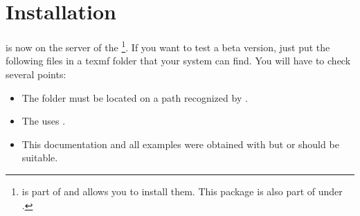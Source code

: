 \section{Installation}

\tkzname{\tkznameofpack} is now on the server of the \footnote{\tkzname{\tkznameofpack} is part of  and  allows you to install them. This package is also part of  under .}. If you want to test a beta version, just put the following files in a texmf folder that your system can find.
You will have to check several points:

\begin{itemize}\setlength{\itemsep}{5pt}
\item  The \tkzname{\tkznameofpack} folder must be located on a path recognized by .
\item  The  \tkzname{\tkznameofpack} uses .
\item This documentation and all examples were obtained with  but  or  should be suitable.
\end{itemize}

\endinput
